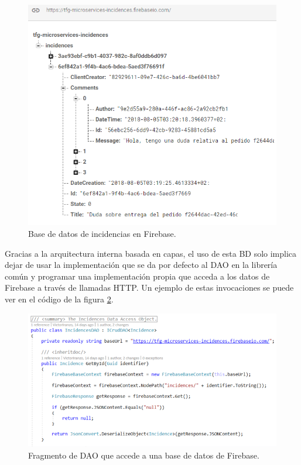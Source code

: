 \documentclass[11pt,spanish,listoffigures]{tfgetsinf}
\begin{document}
\begin{figure}[h]
\centering
\includegraphics[scale=0.85]{Firebase}
\caption{Base de datos de incidencias en Firebase.}
\label{fig:Firebase}
\end{figure}

Gracias a la arquitectura interna basada en capas, el uso de esta BD solo implica dejar de usar la implementación que se da por defecto al DAO en la librería común y programar una implementación propia que acceda a los datos de Firebase a través de llamadas HTTP. Un ejemplo de estas invocaciones se puede ver en el código de la figura \ref{fig:IncidencesDAO}.

\begin{figure}[h]
\centering
\includegraphics[scale=0.8]{IncidencesDAO}
\caption{Fragmento de DAO que accede a una base de datos de Firebase.}
\label{fig:IncidencesDAO}
\end{figure}
\end{document}
